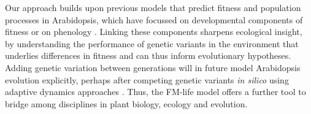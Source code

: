 \documentclass[phd]{infthesis}
\begin{document}
Our approach builds upon previous models that predict fitness and population
processes in Arabidopsis, which have focussed on developmental components of
fitness or on phenology
\citep{prusinkiewicz_evolution_2007,satake_forecasting_2013,springthorpe_flowering_2015}. Linking
these components sharpens ecological insight, by understanding the performance
of genetic variants in the environment that underlies differences in fitness
\citep[see discussions in][]{burghardt_modeling_2015, doebeli_towards_2017} and
can thus inform evolutionary hypotheses. Adding genetic variation between
generations will in future model Arabidopsis evolution explicitly, perhaps after
competing genetic variants \emph{in silico} using adaptive dynamics approaches
\citep{brannstrom_hitchhikers_2013, weise_mechanistic_2015}.  Thus, the FM-life
model offers a further tool to bridge among disciplines in plant biology,
ecology and evolution.

\singlespace

\printbibliography[heading=bibintoc]

\end{document}
